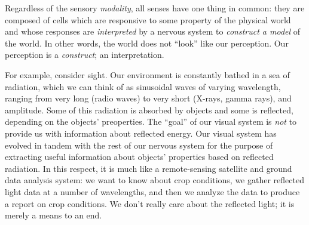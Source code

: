 Regardless of the sensory \emph{modality}, all senses have one thing
in common: they are composed of cells which are responsive to some
property of the physical world and whose responses are
\emph{interpreted} by a nervous system to \emph{construct a model} of
the world. In other words, the world does not ``look'' like our
perception.  Our perception is a \emph{construct}; an interpretation.

For example, consider sight. Our environment is constantly bathed in a
sea of radiation, which we can think of as sinusoidal waves of varying
wavelength, ranging from very long (radio waves) to very short
(X-rays, gamma rays), and amplitude.  Some of this radiation is
absorbed by objects and some is reflected, depending on the objects'
preoperties.  The ``goal'' of our visual system is \emph{not} to
provide us with information about reflected energy.  Our visual system
has evolved in tandem with the rest of our nervous system for the
purpose of extracting useful information about objects' properties
based on reflected radiation.  In this respect, it is much like a
remote-sensing satellite and ground data analysis system: we want to
know about crop conditions, we gather reflected light data at a number
of wavelengths, and then we analyze the data to produce a report on
crop conditions. We don't really care about the reflected light; it is
merely a means to an end.
\end{window}

